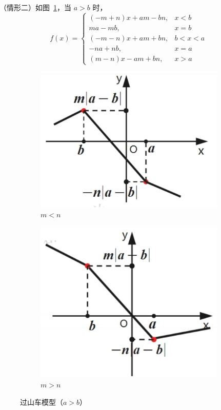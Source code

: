 \documentclass[a4paper,openany]{ctexbook}
\begin{document}
（情形二）如图~\ref{fgr:goujiemoxk2}，当 \(a>b\) 时，
\[f(x)=
    \begin{cases}
        (-m+n)x+am-bn, & x<b   \\
        ma-mb,         & x=b   \\
        (-m-n)x+am+bn, & b<x<a \\
        -na+nb,        & x=a   \\
        (m-n)x-am+bn,  & x>a
    \end{cases}
\]

\begin{figure}
    \centering
    \begin{subfigure}{0.45\textwidth}
        \centering
        \includegraphics[width=\textwidth]{image24.png}
        \caption{\(m<n\)}
    \end{subfigure}
    \hfill
    \begin{subfigure}{0.45\textwidth}
        \centering
        \includegraphics[width=\textwidth]{image25.png}
        \caption{\(m>n\)}
    \end{subfigure}
    \caption{过山车模型（\(a>b\)）}\label{fgr:goujiemoxk2}
\end{figure}
\end{document}
